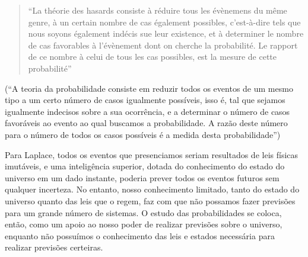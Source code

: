 \begin{quote}
``La théorie des hasards consiste à réduire tous les évènemens du même genre, à un certain nombre de cas également
possibles, c'est-à-dire tels que nous soyons également indécis sue leur existence, et à determiner le nombre de cas
favorables à l'évènement dont on cherche la probabilité. Le rapport de ce nombre à celui de tous les cas possibles,
est la mesure de cette probabilité'' 
\citep{Laplace1814}
\end{quote}

(``A teoria da probabilidade consiste em reduzir todos os eventos de um mesmo tipo a um certo número de casos igualmente
possíveis, isso é, tal que sejamos igualmente indecisos sobre a sua ocorrência, e a determinar o número de casos
favoráveis ao evento ao qual buscamos a probabilidade. A razão deste número para o número de todos os casos possíveis
é a medida desta probabilidade'')

Para Laplace, todos os eventos que presenciamos seriam resultados de leis físicas
imutáveis, e uma inteligência superior, dotada do conhecimento do estado do universo em um dado instante, poderia prever
todos os eventos futuros sem qualquer incerteza. No entanto, nosso conhecimento limitado, tanto do estado do universo
quanto das leis que o regem, faz com que não possamos fazer previsões para um grande número de sistemas. O estudo das 
probabilidades se coloca, então, como um apoio ao nosso poder de realizar previsões sobre o universo, 
enquanto não possuímos o conhecimento das leis e estados necessária para realizar previsões certeiras. 

